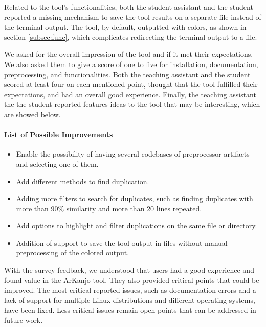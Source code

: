 Related to the tool's functionalities, both the student assistant and the student reported 
a missing mechanism to save the tool results on a separate file instead of the terminal output. 
The tool, by default, outputted with colors, as shown in section \ref{subsec:func}, which complicates 
redirecting the terminal output to a file.

We asked for the overall impression of the tool and if it met their expectations. We also asked 
them to give a score of one to five for installation, documentation, preprocessing, and functionalities. 
Both the teaching assistant and the student scored at least four on each mentioned point, thought that 
the tool fulfilled their expectations, and had an overall good experience. Finally, the teaching assistant 
the the student reported features ideas to the tool that may be interesting, which 
are showed below.

\paragraph{List of Possible Improvements}

\begin{itemize}

\item Enable the possibility of having several codebases of preprocessor artifacts and selecting one of them.

\item Add different methods to find duplication.

\item Adding more filters to search for duplicates, such as finding duplicates with more than 90\% 
similarity and more than 20 lines repeated.

\item Add options to highlight and filter duplications on the same file or directory.

\item Addition of support to save the tool output in files without manual preprocessing of the colored output.

\end{itemize}

With the survey feedback, we understood that users had a good experience and found value in the 
ArKanjo tool. They also provided critical points that could be improved. The most critical 
reported issues, such as documentation errors and a lack of support for multiple Linux distributions 
and different operating systems, have been fixed. Less critical issues remain open points that 
can be addressed in future work.

